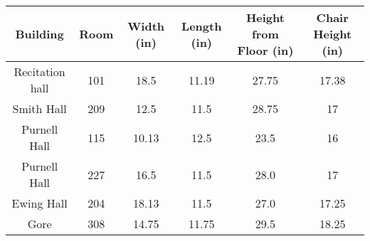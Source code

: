 \documentclass{article}
\begin{document}
\begin{table}[h]
\centering
\begin{tabular}{cccccc}
\toprule
Building & Room & Width (in) & Length (in) & Height from Floor (in) & Chair Height (in)\\
\midrule
Recitation hall & 101 & 18.5 & 11.19 & 27.75 & 17.38 \\
Smith Hall & 209 & 12.5 & 11.5 & 28.75 & 17 \\
Purnell Hall & 115 & 10.13 & 12.5 & 23.5 & 16 \\
Purnell Hall & 227 & 16.5 & 11.5 & 28.0 & 17 \\
Ewing Hall & 204 & 18.13 & 11.5 & 27.0 & 17.25 \\
Gore & 308 & 14.75 & 11.75 & 29.5 & 18.25 \\
\bottomrule
\bottomrule
\end{tabular}
\label{tab:room-dimensions}
\end{table}
\end{document}
